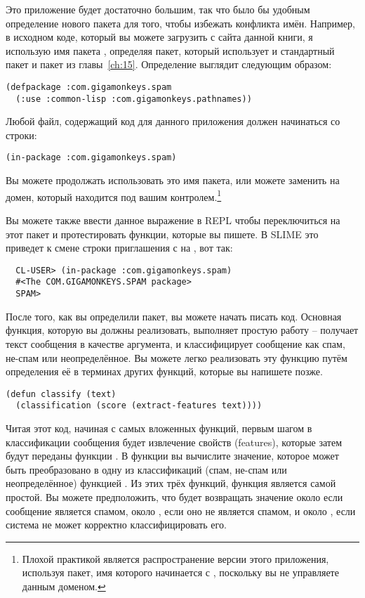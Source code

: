 Это приложение будет достаточно большим, так что было бы удобным определение нового пакета
для того, чтобы избежать конфликта имён.  Например, в исходном коде, который вы можете
загрузить с сайта данной книги, я использую имя пакета ,
определяя пакет, который использует и стандартный пакет  и пакет
 из главы~\ref{ch:15}.  Определение выглядит следующим
образом:

\begin{lstlisting}
(defpackage :com.gigamonkeys.spam
  (:use :common-lisp :com.gigamonkeys.pathnames))
\end{lstlisting}

Любой файл, содержащий код для данного приложения должен начинаться со строки:

\begin{lstlisting}
(in-package :com.gigamonkeys.spam)
\end{lstlisting}

Вы можете продолжать использовать это имя пакета, или можете заменить
 на домен, который находится под вашим контролем.\footnote{Плохой
  практикой является распространение версии этого приложения, используя пакет, имя
  которого начинается с , поскольку вы не управляете данным
  доменом.}

Вы можете также ввести данное выражение в REPL чтобы переключиться на этот пакет и
протестировать функции, которые вы пишете.  В SLIME это приведет к смене строки
приглашения с  на , вот так:

\begin{verbatim}
  CL-USER> (in-package :com.gigamonkeys.spam)
  #<The COM.GIGAMONKEYS.SPAM package>
  SPAM> 
\end{verbatim}

После того, как вы определили пакет, вы можете начать писать код.  Основная функция,
которую вы должны реализовать, выполняет простую работу -- получает текст сообщения в
качестве аргумента, и классифицирует сообщение как спам, не-спам или неопределённое.  Вы
можете легко реализовать эту функцию путём определения её в терминах других функций,
которые вы напишете позже.

\begin{lstlisting}
(defun classify (text)
  (classification (score (extract-features text))))
\end{lstlisting}

Читая этот код, начиная с самых вложенных функций, первым шагом в классификации сообщения
будет извлечение свойств (features), которые затем будут переданы функции .  В
функции  вы вычислите значение, которое может быть преобразовано в одну из
классификаций (спам, не-спам или неопределённое) функцией .  Из этих
трёх функций, функция  является самой простой. Вы можете
предположить, что  будет возвращать значение около  если сообщение
является спамом, около , если оно не является спамом, и около , если
система не может корректно классифицировать его.

